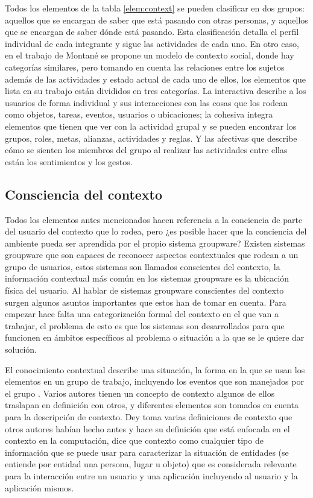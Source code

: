 Todos los elementos de la tabla \ref*{elem:context} se pueden clasificar en dos grupos: aquellos que se encargan de saber que est\'a pasando con otras personas, y aquellos que se encargan de saber d\'onde est\'a pasando. Esta clasificaci\'on detalla el perfil individual de cada integrante y sigue las actividades de cada uno. En otro caso, en el trabajo de Montan\'e \cite{montane2013context} se propone un modelo de contexto social, donde hay categor\'ias similares, pero tomando en cuenta las relaciones entre los sujetos adem\'as de las actividades y estado actual de cada uno de ellos, los elementos que lista en su trabajo est\'an divididos en tres categor\'ias. La interactiva describe a los usuarios de forma individual y sus interacciones con las cosas que los rodean como objetos, tareas, eventos, usuarios o ubicaciones; la cohesiva integra elementos que tienen que ver con la actividad grupal y se pueden encontrar los grupos, roles, metas, alianzas, actividades y reglas. Y las afectivas que describe c\'omo se sienten los miembros del grupo al realizar las actividades entre ellas est\'an los sentimientos y los gestos.

\subsection{Consciencia del contexto}
Todos los elementos antes mencionados hacen referencia a la conciencia de parte del usuario del contexto que lo rodea, pero ¿es posible hacer que la conciencia del ambiente pueda ser aprendida por el propio sistema groupware? Existen sistemas groupware que son capaces de reconocer aspectos contextuales que rodean a un grupo de usuarios, estos sistemas son llamados conscientes del contexto, la informaci\'on contextual m\'as com\'un en los sistemas groupware es la ubicaci\'on f\'isica del usuario. Al hablar de sistemas groupware conscientes del contexto surgen algunos asuntos importantes que estos han de tomar en cuenta. Para empezar hace falta una categorizaci\'on formal del contexto en el que van a trabajar, el problema de esto es que los sistemas son desarrollados para que funcionen en \'ambitos espec\'ificos al problema o situaci\'on a la que se le quiere dar soluci\'on.

El conocimiento contextual describe una situaci\'on, la forma en la que se usan los elementos en un grupo de trabajo, incluyendo los eventos que son manejados por el grupo \cite{brezillon2004context}. Varios autores tienen un concepto de contexto algunos de ellos traslapan en definici\'on con otros, y diferentes elementos son tomados en cuenta para la descripci\'on de contexto. Dey \cite{dey2001conceptual} toma varias definiciones de contexto que otros autores hab\'ian hecho antes y hace su definici\'on que est\'a enfocada en el contexto en la computaci\'on, dice que contexto como cualquier tipo de informaci\'on que se puede usar para caracterizar la situaci\'on de entidades (se entiende por entidad una persona, lugar u objeto) que es considerada relevante para la interacci\'on entre un usuario y una aplicaci\'on incluyendo al usuario y la aplicaci\'on mismos.

